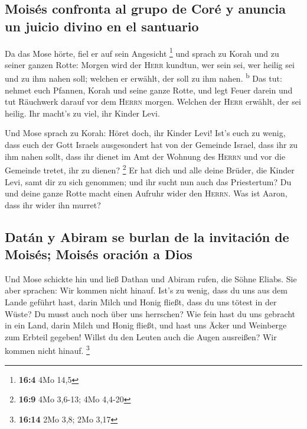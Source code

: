 \hypertarget{moisuxe9s-confronta-al-grupo-de-coruxe9-y-anuncia-un-juicio-divino-en-el-santuario}{%
\subsection{Moisés confronta al grupo de Coré y anuncia un juicio divino
en el
santuario}\label{moisuxe9s-confronta-al-grupo-de-coruxe9-y-anuncia-un-juicio-divino-en-el-santuario}}

 Da das Mose hörte, fiel er auf sein Angesicht \footnote{\textbf{16:4}
  4Mo 14,5}  und sprach zu Korah und zu seiner ganzen
Rotte: Morgen wird der \textsc{Herr} kundtun, wer sein sei, wer heilig
sei und zu ihm nahen soll; welchen er erwählt, der soll zu ihm nahen.
\textsuperscript{b}  Das tut: nehmet euch Pfannen, Korah
und seine ganze Rotte,  und legt Feuer darein und tut
Räuchwerk darauf vor dem \textsc{Herrn} morgen. Welchen der
\textsc{Herr} erwählt, der sei heilig. Ihr macht's zu viel, ihr Kinder
Levi.

 Und Mose sprach zu Korah: Höret doch, ihr Kinder Levi!
 Ist's euch zu wenig, dass euch der Gott Israels
ausgesondert hat von der Gemeinde Israel, dass ihr zu ihm nahen sollt,
dass ihr dienet im Amt der Wohnung des \textsc{Herrn} und vor die
Gemeinde tretet, ihr zu dienen? \footnote{\textbf{16:9} 4Mo 3,6-13; 4Mo
  4,4-20}  Er hat dich und alle deine Brüder, die Kinder
Levi, samt dir zu sich genommen; und ihr sucht nun auch das Priestertum?
 Du und deine ganze Rotte macht einen Aufruhr wider den
\textsc{Herrn}. Was ist Aaron, dass ihr wider ihn murret?

\hypertarget{datuxe1n-y-abiram-se-burlan-de-la-invitaciuxf3n-de-moisuxe9s-moisuxe9s-oraciuxf3n-a-dios}{%
\subsection{Datán y Abiram se burlan de la invitación de Moisés; Moisés
oración a
Dios}\label{datuxe1n-y-abiram-se-burlan-de-la-invitaciuxf3n-de-moisuxe9s-moisuxe9s-oraciuxf3n-a-dios}}

 Und Mose schickte hin und ließ Dathan und Abiram rufen,
die Söhne Eliabs. Sie aber sprachen: Wir kommen nicht hinauf.
 Ist's zu wenig, dass du uns aus dem Lande geführt hast,
darin Milch und Honig fließt, dass du uns tötest in der Wüste? Du musst
auch noch über uns herrschen?  Wie fein hast du uns
gebracht in ein Land, darin Milch und Honig fließt, und hast uns Äcker
und Weinberge zum Erbteil gegeben! Willst du den Leuten auch die Augen
ausreißen? Wir kommen nicht hinauf. \footnote{\textbf{16:14} 2Mo 3,8;
  2Mo 3,17}

